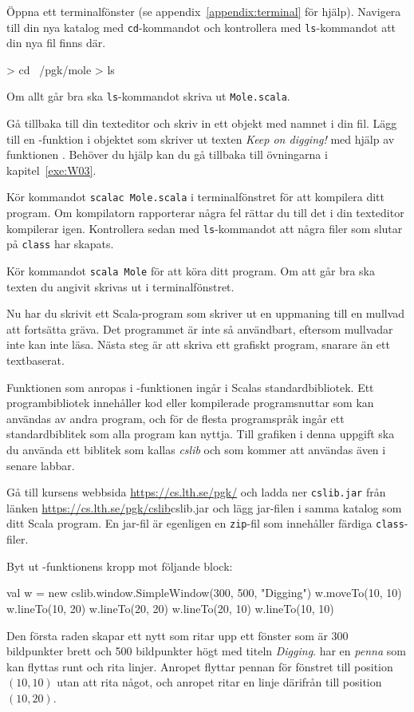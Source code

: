 \Subtask
Öppna ett terminalfönster (se appendix~\ref{appendix:terminal} för hjälp).
Navigera till din nya katalog med \texttt{cd}-kommandot  och kontrollera med \texttt{ls}-kommandot  att din nya fil finns där.
\begin{REPLnonum}
> cd ~/pgk/mole
> ls
\end{REPLnonum}
Om allt går bra ska \texttt{ls}-kommandot skriva ut \texttt{Mole.scala}.

\Subtask
Gå tillbaka till din texteditor och skriv in ett objekt med namnet  i din fil.
Lägg till en -funktion i objektet som skriver ut texten \emph{Keep on digging!} med hjälp av funktionen .
Behöver du hjälp kan du gå tillbaka till övningarna i kapitel~\ref{exe:W03}.

\Subtask
Kör kommandot \texttt{scalac Mole.scala} i terminalfönstret för att kompilera ditt program.
Om kompilatorn rapporterar några fel rättar du till det i din texteditor kompilerar igen.
Kontrollera sedan med \texttt{ls}-kommandot att några filer som slutar på \texttt{class} har skapats.

\Subtask
Kör kommandot \texttt{scala Mole} för att köra ditt program.
Om att går bra ska texten du angivit skrivas ut i terminalfönstret.


\Task
Nu har du skrivit ett Scala-program som skriver ut en uppmaning till en mullvad att fortsätta gräva.
Det programmet är inte så användbart, eftersom mullvadar inte kan inte läsa.
Nästa steg är att skriva ett grafiskt program, snarare än ett textbaserat.

Funktionen  som anropas i -funktionen ingår i Scalas standardbibliotek.
Ett programbibliotek innehåller kod eller kompilerade programsnuttar som kan användas av andra program, och för de flesta programspråk ingår ett standardbiblitek som alla program kan nyttja.
Till grafiken i denna uppgift ska du använda ett biblitek som kallas \emph{cslib} och som kommer att användas även i senare labbar.

\Subtask
Gå till kursens webbsida \url{https://cs.lth.se/pgk/} och ladda ner \texttt{cslib.jar} från länken \url{https://cs.lth.se/pgk/cslib}{cslib.jar} och lägg jar-filen i samma katalog som ditt Scala program.
En jar-fil är egenligen en \texttt{zip}-fil som innehåller färdiga \texttt{class}-filer.

\Subtask
Byt ut -funktionens kropp mot följande block:
\begin{Code}
{
	val w = new cslib.window.SimpleWindow(300, 500, "Digging")
	w.moveTo(10, 10)
	w.lineTo(10, 20)
	w.lineTo(20, 20)
	w.lineTo(20, 10)
	w.lineTo(10, 10)
}
\end{Code}
Den första raden skapar ett nytt  som ritar upp ett fönster som är 300 bildpunkter brett och 500 bildpunkter högt med titeln \emph{Digging}.
 har en \emph{penna} som kan flyttas runt och rita linjer.
Anropet  flyttar pennan för fönstret  till position $(10,10)$ utan att rita något, och anropet  ritar en linje därifrån till position $(10, 20)$.

